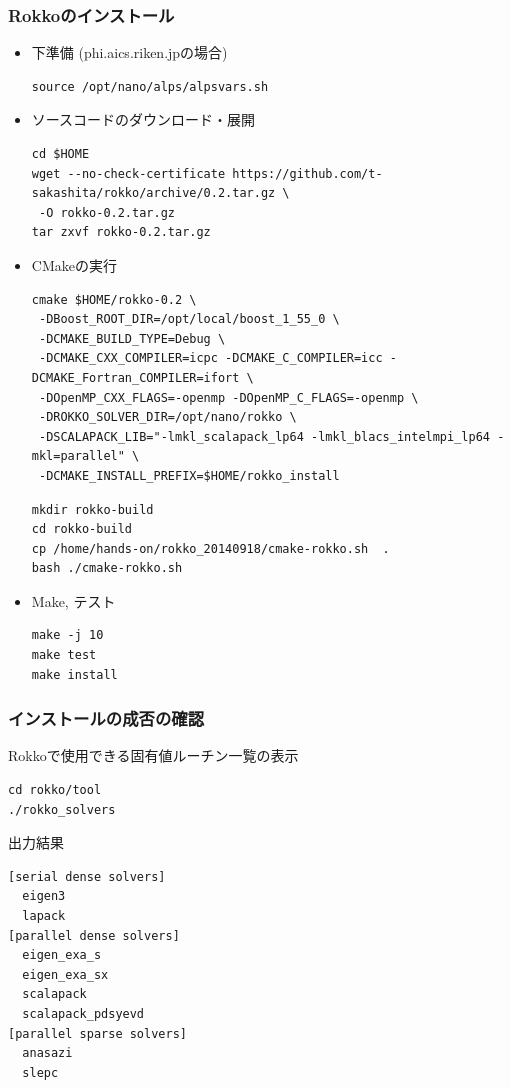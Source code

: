 \begin{frame}[c,fragile]
  \frametitle{Rokkoのインストール}
  \begin{itemize}
  \item 下準備 (phi.aics.riken.jpの場合)
\begin{lstlisting}[style=shstyle]
source /opt/nano/alps/alpsvars.sh
\end{lstlisting}
  \item ソースコードのダウンロード・展開
\begin{lstlisting}[style=shstyle]
cd $HOME
wget --no-check-certificate https://github.com/t-sakashita/rokko/archive/0.2.tar.gz \
 -O rokko-0.2.tar.gz
tar zxvf rokko-0.2.tar.gz
\end{lstlisting}
  \item CMakeの実行
\begin{lstlisting}[style=shstyle, deletekeywords={local}]
cmake $HOME/rokko-0.2 \
 -DBoost_ROOT_DIR=/opt/local/boost_1_55_0 \
 -DCMAKE_BUILD_TYPE=Debug \
 -DCMAKE_CXX_COMPILER=icpc -DCMAKE_C_COMPILER=icc -DCMAKE_Fortran_COMPILER=ifort \
 -DOpenMP_CXX_FLAGS=-openmp -DOpenMP_C_FLAGS=-openmp \
 -DROKKO_SOLVER_DIR=/opt/nano/rokko \
 -DSCALAPACK_LIB="-lmkl_scalapack_lp64 -lmkl_blacs_intelmpi_lp64 -mkl=parallel" \
 -DCMAKE_INSTALL_PREFIX=$HOME/rokko_install
\end{lstlisting}

\begin{lstlisting}[style=shstyle]
mkdir rokko-build
cd rokko-build
cp /home/hands-on/rokko_20140918/cmake-rokko.sh  .
bash ./cmake-rokko.sh
\end{lstlisting}
  \item Make, テスト
\begin{lstlisting}
make -j 10
make test
make install
\end{lstlisting}
  \end{itemize}
\end{frame}

\begin{frame}[c,fragile]
  \frametitle{インストールの成否の確認}
Rokkoで使用できる固有値ルーチン一覧の表示
\begin{lstlisting}[style=shstyle]
cd rokko/tool
./rokko_solvers
\end{lstlisting}

出力結果
\begin{lstlisting}
[serial dense solvers]
  eigen3
  lapack
[parallel dense solvers]
  eigen_exa_s
  eigen_exa_sx
  scalapack
  scalapack_pdsyevd
[parallel sparse solvers]
  anasazi
  slepc
\end{lstlisting}

\end{frame}

